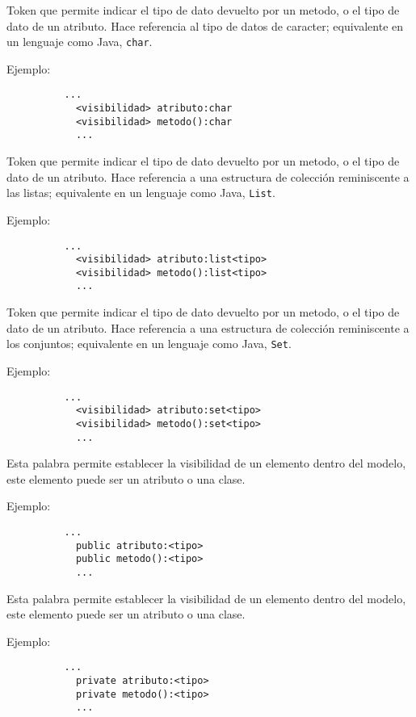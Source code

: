 \begin{description}[align=right,labelwidth=2.5cm]
\item [char] Token que permite indicar el tipo de dato devuelto por un metodo, o
	el tipo de dato de un atributo. Hace referencia al tipo de
	datos de caracter; equivalente en un lenguaje como Java, \texttt{char}.

	Ejemplo:
		\begin{lstlisting}
		  ...
			<visibilidad> atributo:char
			<visibilidad> metodo():char
			...
		\end{lstlisting}

\item [list] Token que permite indicar el tipo de dato devuelto por un metodo, o
	el tipo de dato de un atributo. Hace referencia a una
	estructura de colección reminiscente a las listas; equivalente en un lenguaje
	como Java, \texttt{List}.

	Ejemplo:
		\begin{lstlisting}
		  ...
			<visibilidad> atributo:list<tipo>
			<visibilidad> metodo():list<tipo>
			...
		\end{lstlisting}

\item[set] Token que permite indicar el tipo de dato devuelto por un metodo, o
	el tipo de dato de un atributo. Hace referencia a una
	estructura de colección reminiscente a los conjuntos; equivalente en un lenguaje
	como Java, \texttt{Set}.

	Ejemplo:
		\begin{lstlisting}
		  ...
			<visibilidad> atributo:set<tipo>
			<visibilidad> metodo():set<tipo>
			...
		\end{lstlisting}

\item [public] Esta palabra permite establecer la visibilidad de un elemento
	dentro del modelo, este elemento puede ser un atributo o una clase.

	Ejemplo:
		\begin{lstlisting}
		  ...
			public atributo:<tipo>
			public metodo():<tipo>
			...
		\end{lstlisting}

\item [private] Esta palabra permite establecer la visibilidad de un elemento
	dentro del modelo, este elemento puede ser un atributo o una clase.

	Ejemplo:
		\begin{lstlisting}
		  ...
			private atributo:<tipo>
			private metodo():<tipo>
			...
		\end{lstlisting}


\end{description}
